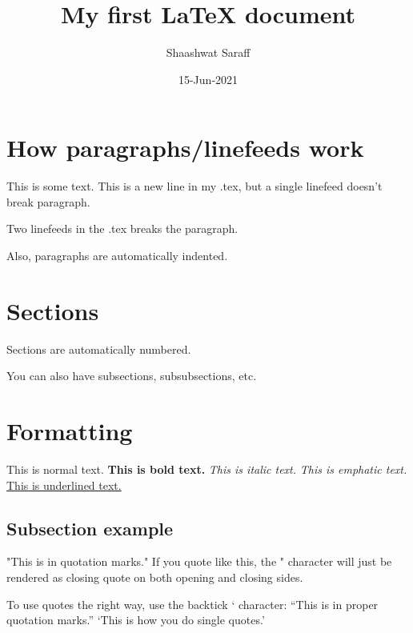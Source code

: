 \documentclass{article}
\author{Shaashwat Saraff}
\title{My first {\LaTeX} document}
\date{15-Jun-2021}
\begin{document}
  \maketitle


  \section{How paragraphs/linefeeds work}

    This is some text.
    This is a new line in my .tex, but a single linefeed doesn't break paragraph.

    Two linefeeds in the .tex breaks the paragraph.

    Also, paragraphs are automatically indented. 


  \section{Sections}

    Sections are automatically numbered.

    You can also have subsections, subsubsections, etc.


  \section{Formatting}

    This is normal text. 
    \textbf{This is bold text.} 
    \textit{This is italic text.} 
    \emph{This is emphatic text.} 
    \underline{This is underlined text.}


    \subsection{Subsection example}

    "This is in quotation marks." If you quote like this, the " character will just be rendered as closing quote on both opening and closing sides. 

    To use quotes the right way, use the backtick ` character:
    ``This is in proper quotation marks.'' `This is how you do single quotes.'
\end{document}
